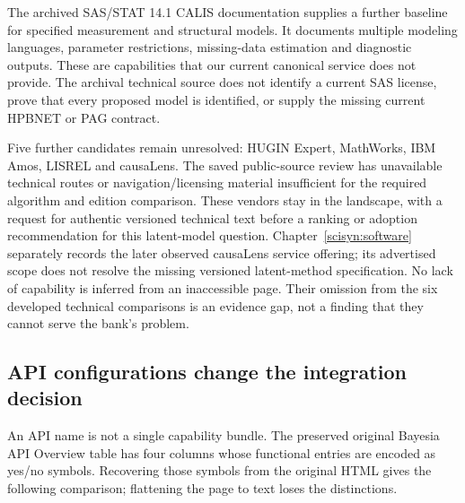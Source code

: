 The archived SAS/STAT 14.1 CALIS documentation supplies a further
baseline for specified measurement and structural models. It documents
multiple modeling languages, parameter restrictions, missing-data
estimation and diagnostic outputs. These are capabilities that our
current canonical service does not provide. The archival technical
source does not identify a current SAS license, prove that every
proposed model is identified, or supply the missing current HPBNET or
PAG contract. \citep{exec13_latent_sas_calis}

Five further candidates remain unresolved: HUGIN Expert, MathWorks, IBM
Amos, LISREL and causaLens. The saved public-source review has
unavailable technical routes or navigation/licensing material
insufficient for the required algorithm and edition comparison. These
vendors stay in the landscape, with a request for authentic versioned
technical text before a ranking or adoption recommendation for this latent-model
question. Chapter~\ref{scisyn:software} separately records the later observed
causaLens service offering; its advertised scope does not resolve the missing
versioned latent-method specification. No lack of capability is inferred from
an inaccessible page. Their omission from
the six developed technical comparisons is an evidence gap, not a
finding that they cannot serve the bank's problem.

\hypertarget{api-configurations-change-the-integration-decision}{%
\subsection{API configurations change the integration
decision}\label{api-configurations-change-the-integration-decision}}

An API name is not a single capability bundle. The preserved original
Bayesia API Overview table has four columns whose functional entries are
encoded as yes/no symbols. Recovering those symbols from the original
HTML gives the following comparison; flattening the page to text loses
the distinctions. \citep{exec13_bayesia_api}

